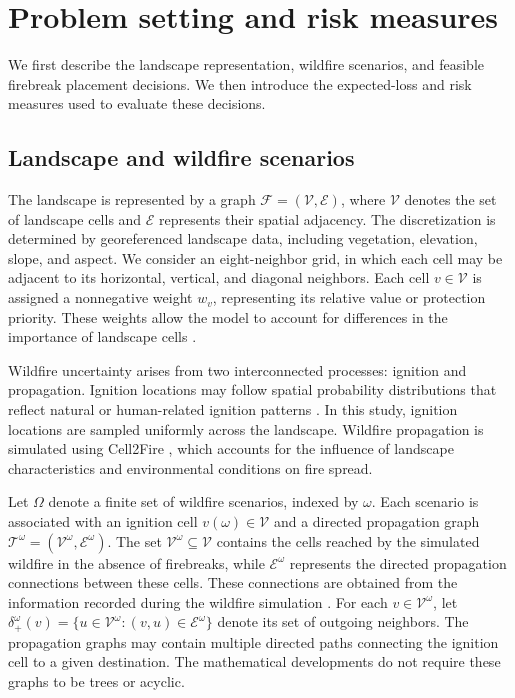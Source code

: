 \documentclass{itor}
\begin{document}
\section{Problem setting and risk measures}
\label{sec2}

We first describe the landscape representation, wildfire
scenarios, and feasible firebreak placement decisions.
We then introduce the expected-loss and risk measures
used to evaluate these decisions.

\subsection{Landscape and wildfire scenarios}

The landscape is represented by a graph
$\mathcal{F}=(\mathcal{V},\mathcal{E})$, where
$\mathcal{V}$ denotes the set of landscape cells and
$\mathcal{E}$ represents their spatial adjacency.
The discretization is determined by georeferenced
landscape data, including vegetation, elevation, slope,
and aspect. We consider an eight-neighbor grid, in
which each cell may be adjacent to its horizontal,
vertical, and diagonal neighbors. Each cell
$v\in\mathcal{V}$ is assigned a nonnegative weight
$w_v$, representing its relative value or protection
priority. These weights allow the model to account
for differences in the importance of landscape
cells \citep{carrasco2023firebreak}.

Wildfire uncertainty arises from two interconnected
processes: ignition and propagation. Ignition locations
may follow spatial probability distributions that reflect
natural or human-related ignition patterns
\citep{carrasco2021exploring}. In this study, ignition
locations are sampled uniformly across the landscape.
Wildfire propagation is simulated using Cell2Fire
\citep{pais2021cell2fire}, which accounts for the
influence of landscape characteristics and
environmental conditions on fire spread.

Let $\Omega$ denote a finite set of wildfire scenarios,
indexed by $\omega$. Each scenario is associated with
an ignition cell $v(\omega)\in\mathcal{V}$ and a
directed propagation graph
$\mathcal{T}^{\omega}
=(\mathcal{V}^{\omega},\mathcal{E}^{\omega})$.
The set $\mathcal{V}^{\omega}\subseteq\mathcal{V}$
contains the cells reached by the simulated wildfire
in the absence of firebreaks, while
$\mathcal{E}^{\omega}$ represents the directed
propagation connections between these cells.
These connections are obtained from the information
recorded during the wildfire simulation
\citep{pais2021downstream}. For each $v\in\mathcal{V}^{\omega}$, let 
$\delta_+^{\omega}(v)
=
\{u\in\mathcal{V}^{\omega}:
(v,u)\in\mathcal{E}^{\omega}\}$ 
denote its set of outgoing neighbors.
The propagation graphs may contain multiple
directed paths connecting the ignition cell to
a given destination. The mathematical developments
do not require these graphs to be trees or acyclic.
\end{document}

